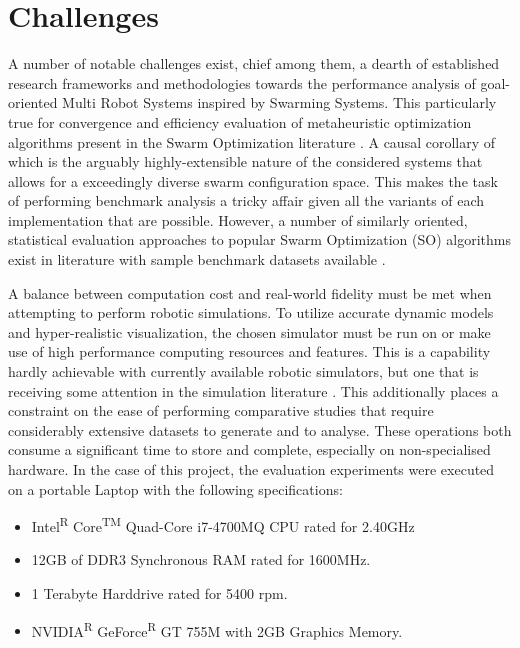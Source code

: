 \documentclass{report}
\begin{document}
\section{Challenges}
A number of notable challenges exist, chief among them, a dearth of established research frameworks and methodologies towards the performance analysis of goal-oriented Multi Robot Systems inspired by Swarming Systems. This particularly true for convergence and efficiency evaluation of metaheuristic optimization algorithms present in the Swarm Optimization literature \cite{Yang2011}. A causal corollary of which is the arguably highly-extensible nature of the considered systems that allows for a exceedingly diverse swarm configuration space. This makes the task of performing benchmark analysis a tricky affair given all the variants of each implementation that are possible. However, a number of similarly oriented, statistical evaluation approaches to popular Swarm Optimization (SO) algorithms exist in literature \cite{Selvi2010} \cite{Yang2011} with sample benchmark datasets available \cite{Gerhard1991}.

A balance between computation cost and real-world fidelity must be met when attempting to perform robotic simulations. To utilize accurate dynamic models and hyper-realistic visualization, the chosen simulator must be run on or make use of high performance computing resources and features. This is a capability hardly achievable with currently available robotic simulators, but one that is receiving some attention in the simulation literature \cite{Shah2018}. This additionally places a constraint on the ease of performing comparative studies that require considerably extensive datasets to generate and to analyse. These operations both consume a significant time to store and complete, especially on non-specialised hardware. In the case of this project, the evaluation experiments were executed on a portable Laptop with the following specifications:
\begin{itemize}
	\item Intel\textsuperscript{R} Core\textsuperscript{TM} Quad-Core i7-4700MQ CPU rated for 2.40GHz
	\item 12GB of DDR3 Synchronous RAM rated for 1600MHz.
	\item 1 Terabyte Harddrive rated for 5400 rpm.
	\item NVIDIA\textsuperscript{R} GeForce\textsuperscript{R} GT 755M with 2GB Graphics Memory.
\end{itemize}
\end{document}
